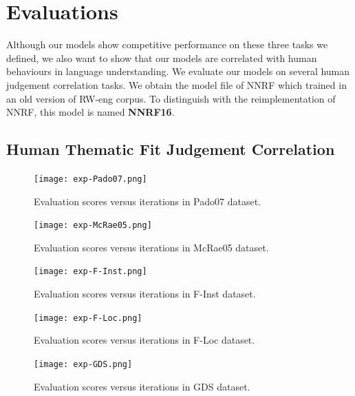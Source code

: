 \documentclass[a4paper]{article}
\begin{document}
\section{Evaluations} \label{sec:evaluation}
Although our models show competitive performance on these three tasks we defined, we also want to show that our models are correlated with human behaviours in language understanding. We evaluate our models on several human judgement correlation tasks. We obtain the model file of NNRF which trained in an old version of RW-eng corpus. To distinguish with the reimplementation of NNRF, this model is named \textbf{NNRF16}. 


\subsection{Human Thematic Fit Judgement Correlation}  \label{sec:thematicfit}


\begin{figure}[p]
\centering
\texttt{[image: exp-Pado07.png]}
\caption{\label{fig:exp-Pado07} Evaluation scores versus iterations in Pado07 dataset. }
\end{figure}

\begin{figure}[p]
\centering
\texttt{[image: exp-McRae05.png]}
\caption{\label{fig:exp-McRae05} Evaluation scores versus iterations in McRae05 dataset. }
\end{figure}

\begin{figure}[p]
\centering
\texttt{[image: exp-F-Inst.png]}
\caption{\label{fig:exp-F-Inst} Evaluation scores versus iterations in F-Inst dataset. }
\end{figure}

\begin{figure}[p]
\centering
\texttt{[image: exp-F-Loc.png]}
\caption{\label{fig:exp-F-Loc} Evaluation scores versus iterations in F-Loc dataset. }
\end{figure}

\begin{figure}[p]
\centering
\texttt{[image: exp-GDS.png]}
\caption{\label{fig:exp-GDS} Evaluation scores versus iterations in GDS dataset. }
\end{figure}
\end{document}
